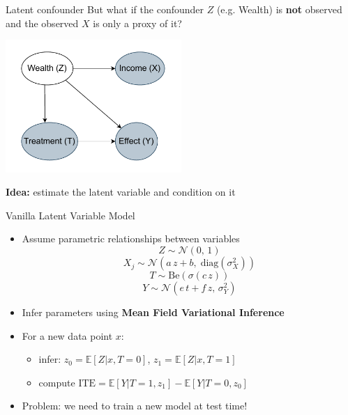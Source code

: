 \documentclass[10pt]{beamer}
\begin{document}
\begin{frame}{Latent confounder}
But what if the confounder $Z$ (e.g. Wealth) is \textbf{not} observed and the observed $X$ is only a proxy of it?
    \begin{center}
  \includegraphics[width=0.5\textwidth]{images/latent_confounder.pdf}
\end{center}
  
\textbf{Idea:} estimate the latent variable and condition on it

 \end{frame}


 \begin{frame}{Vanilla Latent Variable Model}
     \begin{itemize}
         \item Assume parametric relationships between variables
         \begin{equation*}
           Z \sim \mathcal{N}(0,\,1)
         \end{equation*}
         \begin{equation*}
           X_j \sim \mathcal{N}(a\,z + b,\; \text{diag}(\sigma_X^2))
         \end{equation*}
        \begin{equation*}
           T \sim \mathrm{Be}(\sigma(c\,z))
         \end{equation*}
        \begin{equation*}
           Y \sim \mathcal{N}(e\,t + f\,z,\,\sigma_Y^2)
         \end{equation*}
         \item Infer parameters using \textbf{Mean Field Variational Inference}
         \item For a new data point $x$:
         \begin{itemize}
             \item infer: $z_0 =\mathbb{E}[Z|x,T=0]$, $z_1=\mathbb{E}[Z|x,T=1]$
             \item compute $\text{ITE} = \mathbb{E}[Y|T=1,z_1]-\mathbb{E}[Y|T=0,z_0]$
         \end{itemize}
          \item \alert{Problem:} we need to train a new model at test time!
     \end{itemize}
 \end{frame}
\end{document}
